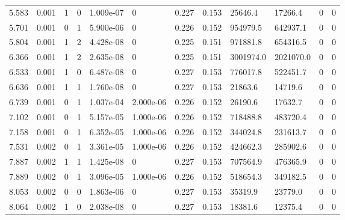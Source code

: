 \documentclass[preview]{standalone}
\begin{document}
{{\begin{tabular}{L{1.2cm}C{1.2cm} C{0.3cm}C{0.5cm} C{1.4cm}C{1.4cm} C{1.4cm}C{1.4cm} C{1.6cm}C{1.6cm} C{1.6cm}C{1.6cm}}
  5.583  &  0.001  & 1     &  0 &  1.009e-07  & 0  &  0.227&   0.153& 25646.4 & 17266.4   &  0 & 0  \\ 
  5.701  &  0.001  & 0     &  1 &  5.900e-06  & 0  &  0.226&   0.152& 954979.5 & 642937.1   &  0 & 0  \\ 
  5.804  &  0.001  & 1     &  2 &  4.428e-08  & 0  &  0.225&   0.151& 971881.8 & 654316.5   &  0 & 0  \\ 
  6.366  &  0.001  & 1     &  2 &  2.635e-08  & 0  &  0.225&   0.151& 3001974.0 & 2021070.0   &  0 & 0  \\ 
  6.533  &  0.001  & 1     &  0 &  6.487e-08  & 0  &  0.227&   0.153& 776017.8 & 522451.7   &  0 & 0  \\ 
  6.636  &  0.001  & 1     &  1 &  1.760e-08  & 0  &  0.227&   0.153& 21863.6 & 14719.6   &  0 & 0  \\ 
  6.739  &  0.001  & 0     &  1 &  1.037e-04  & 2.000e-06  &  0.226&   0.152& 26190.6 & 17632.7   &  0 & 0  \\ 
  7.102  &  0.001  & 0     &  1 &  5.157e-05  & 1.000e-06  &  0.226&   0.152& 718488.8 & 483720.4   &  0 & 0  \\ 
  7.158  &  0.001  & 0     &  1 &  6.352e-05  & 1.000e-06  &  0.226&   0.152& 344024.8 & 231613.7   &  0 & 0  \\ 
  7.531  &  0.002  & 0     &  1 &  3.361e-05  & 1.000e-06  &  0.226&   0.152& 424662.3 & 285902.6   &  0 & 0  \\ 
  7.887  &  0.002  & 1     &  1 &  1.425e-08  & 0  &  0.227&   0.153& 707564.9 & 476365.9   &  0 & 0  \\ 
  7.889  &  0.002  & 0     &  1 &  3.096e-05  & 1.000e-06  &  0.226&   0.152& 518654.3 & 349182.5   &  0 & 0  \\ 
  8.053  &  0.002  & 0     &  0 &  1.863e-06  & 0  &  0.227&   0.153& 35319.9 & 23779.0   &  0 & 0  \\ 
  8.064  &  0.002  & 1     &  0 &  2.038e-08  & 0  &  0.227&   0.153& 18381.6 & 12375.4   &  0 & 0  \\ 
\hline 
\end{tabular} 

}}
\end{document}
